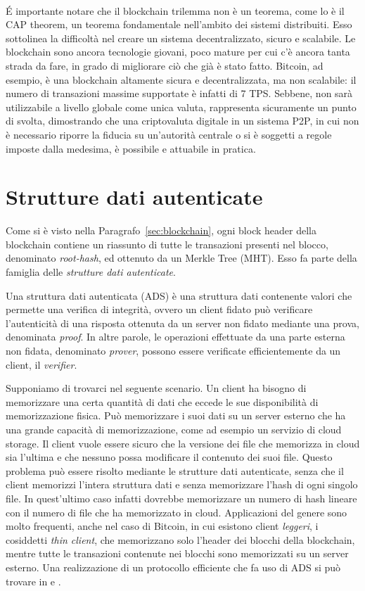 \paragraph*{}
\'E importante notare che il blockchain trilemma non è un teorema, come lo è il CAP theorem, un teorema fondamentale nell'ambito dei sistemi distribuiti. Esso sottolinea la difficoltà nel creare un sistema decentralizzato, sicuro e scalabile. Le blockchain sono ancora tecnologie giovani, poco mature per cui c'è ancora tanta strada da fare, in grado di migliorare ciò che già è stato fatto. Bitcoin, ad esempio, è una blockchain altamente sicura e decentralizzata, ma non scalabile: il numero di transazioni massime supportate è infatti di 7 TPS. Sebbene, non sarà utilizzabile a livello globale come unica valuta, rappresenta sicuramente un punto di svolta, dimostrando che una criptovaluta digitale in un sistema P2P, in cui non è necessario riporre la fiducia su un'autorità centrale o si è soggetti a regole imposte dalla medesima, è possibile e attuabile in pratica.


\section{Strutture dati autenticate}\label{sec:ads}

Come si è visto nella Paragrafo~\ref{sec:blockchain}, ogni block header della blockchain contiene un riassunto di tutte le transazioni presenti nel blocco, denominato \emph{root-hash}, ed ottenuto da un Merkle Tree (MHT). Esso fa parte della famiglia delle \emph{strutture dati autenticate}.

Una struttura dati autenticata (ADS) è una struttura dati contenente valori che permette una verifica di integrità, ovvero un client fidato può verificare l'autenticità di una risposta ottenuta da un server non fidato mediante una prova, denominata \emph{proof}. In altre parole, le operazioni effettuate da una parte esterna non fidata, denominato \emph{prover}, possono essere verificate efficientemente da un client, il \emph{verifier}.

Supponiamo di trovarci nel seguente scenario. Un client ha bisogno di memorizzare una certa quantità di dati che eccede le sue disponibilità di memorizzazione fisica. Può memorizzare i suoi dati su un server esterno che ha una grande capacità di memorizzazione, come ad esempio un servizio di cloud storage. Il client vuole essere sicuro che la versione dei file che memorizza in cloud sia l'ultima e che nessuno possa modificare il contenuto dei suoi file. Questo problema può essere risolto mediante le strutture dati autenticate, senza che il client memorizzi l'intera struttura dati e senza memorizzare l'hash di ogni singolo file. In quest'ultimo caso infatti dovrebbe memorizzare un numero di hash lineare con il numero di file che ha memorizzato in cloud. Applicazioni del genere sono molto frequenti, anche nel caso di Bitcoin, in cui esistono client \emph{leggeri}, i cosiddetti \emph{thin client}, che memorizzano solo l'header dei blocchi della blockchain, mentre tutte le transazioni contenute nei blocchi sono memorizzati su un server esterno. Una realizzazione di un protocollo efficiente che fa uso di ADS si può trovare in \cite{pennino2019pipeline} e \cite{gdm}.


